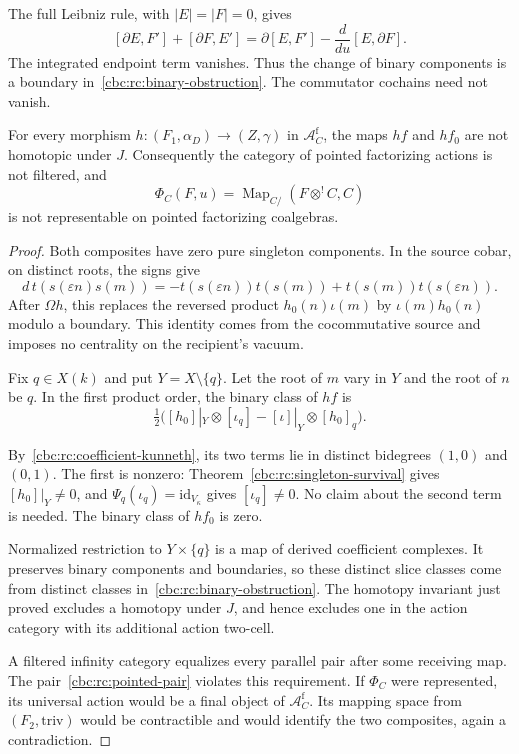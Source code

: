 The full Leibniz rule, with $|E|=|F|=0$, gives
\[
 [\partial E,F']+[\partial F,E']
   =\partial[E,F']-\frac{d}{du}[E,\partial F].
\]
The integrated endpoint term vanishes.
Thus the change of binary components is a
boundary in~\eqref{cbc:rc:binary-obstruction}.
The commutator cochains need not vanish.

\begin{theorem}\label{cbc:rc:pointed-nonrepresentability}
For every morphism
$h:(F_1,\alpha_D)\to(Z,\gamma)$ in
$\mathscr A_C^{\mathrm f}$, the maps $hf$ and
$hf_0$ are not homotopic under $J$.
Consequently the category of pointed factorizing
actions is not filtered, and
\[
 \Phi_C(F,u)=\operatorname{Map}_{C/}(F\otimes^!C,C)
\]
is not representable on pointed factorizing
coalgebras.
\end{theorem}
\begin{proof}
Both composites have zero pure singleton
components. In the source cobar, on distinct
roots, the signs give
\[
 d\,t(s(\varepsilon n)s(m))
   =-t(s(\varepsilon n))t(s(m))
      +t(s(m))t(s(\varepsilon n)).
\]
After $\Omega h$, this replaces the reversed
product $h_0(n)\iota(m)$ by $\iota(m)h_0(n)$
modulo a boundary. This identity comes from
the cocommutative source and imposes no
centrality on the recipient's vacuum.

Fix $q\in X(k)$ and put $Y=X\setminus\{q\}$.
Let the root of $m$ vary in $Y$ and the
root of $n$ be $q$. In the first product
order, the binary class of $hf$ is
\[
 \tfrac12\bigl([h_0]|_Y\otimes[\iota_q]
                    -[\iota]|_Y\otimes[h_0]_q\bigr).
\]

By~\eqref{cbc:rc:coefficient-kunneth}, its two
terms lie in distinct bidegrees $(1,0)$ and
$(0,1)$. The first is nonzero:
Theorem~\ref{cbc:rc:singleton-survival} gives
$[h_0]|_Y\ne0$, and
$\Psi_q(\iota_q)=\mathrm{id}_{V_\kappa}$ gives
$[\iota_q]\ne0$.
No claim about the second term is needed.
The binary class of $hf_0$ is zero.

Normalized restriction to $Y\times\{q\}$
is a map of derived coefficient complexes.
It preserves binary components and boundaries,
so these distinct slice classes come from
distinct classes in~\eqref{cbc:rc:binary-obstruction}.
The homotopy invariant just proved excludes
a homotopy under $J$, and hence excludes one
in the action category with its additional
action two-cell.

A filtered infinity category equalizes every
parallel pair after some receiving map.
The pair~\eqref{cbc:rc:pointed-pair} violates
this requirement. If $\Phi_C$ were represented,
its universal action would be a final object
of $\mathscr A_C^{\mathrm f}$. Its mapping
space from $(F_2,\mathrm{triv})$ would be
contractible and would identify the two
composites, again a contradiction.
\end{proof}

